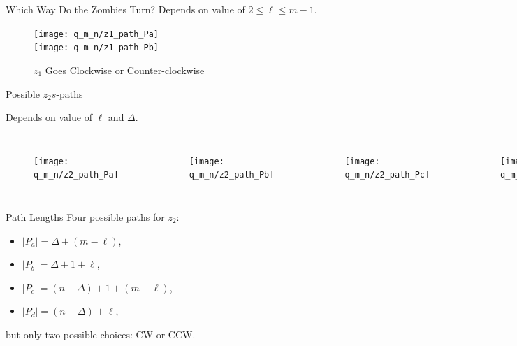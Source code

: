 \begin{frame}{Which Way Do the Zombies Turn?}
Depends on value of $2 \leq \ell \leq m-1$.
\begin{figure}
\centering
\texttt{[image: q\_m\_n/z1\_path\_Pa]} \\
\texttt{[image: q\_m\_n/z1\_path\_Pb]}
\caption{$z_1$ Goes Clockwise or Counter-clockwise}
\end{figure}
\end{frame}

\begin{frame}{Possible $z_2s$-paths}

Depends on value of $\ell$ and $\Delta$.
\begin{columns}[onlytextwidth, T]
\begin{figure}
\texttt{[image: q\_m\_n/z2\_path\_Pa]}
\end{figure}
\begin{figure}
\texttt{[image: q\_m\_n/z2\_path\_Pb]}
\end{figure}

\begin{figure}
\texttt{[image: q\_m\_n/z2\_path\_Pc]}
\end{figure}
\begin{figure}
\texttt{[image: q\_m\_n/z2\_path\_Pd]}
\end{figure}
\end{columns}
\end{frame}

\begin{frame}{Path Lengths}
Four possible paths for $z_2$:
\vspace{1cm}
\begin{itemize}
\item $|P_a| = \Delta + (m - \ell)$,
\item $|P_b| = \Delta + 1 + \ell$,
\item $|P_c| = (n-\Delta) + 1 + (m-\ell)$,
\item $|P_d| = (n-\Delta) + \ell$,
\end{itemize}

\vspace{1cm}
but only two possible choices: CW or CCW.

\end{frame}

